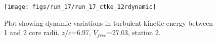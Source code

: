 \begin{figure}[H]
\centering
\texttt{[image: figs/run\_17/run\_17\_ctke\_12rdynamic]}
\caption{Plot showing dynamic variations in turbulent kinetic energy between 1 and 2 core radii. $z/c$=6.97, $V_{free}$=27.03, station 2.}
\label{fig:run_17_ctke_12rdynamic}
\end{figure}


